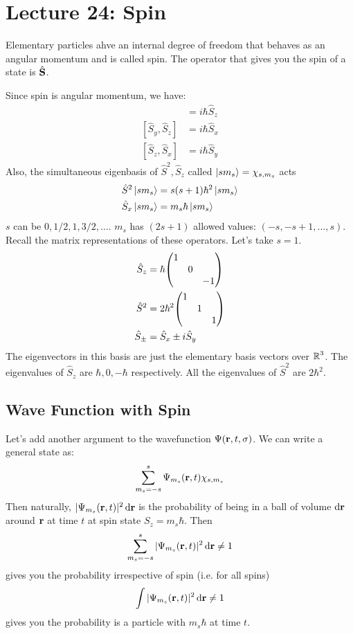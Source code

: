 \section{Lecture 24: Spin} 

\begin{definition}[Spin]
    Elementary particles ahve an internal degree of freedom that behaves as an angular momentum and is called spin.
    The operator that gives you the spin of a state is $\hat{\mathbf{S}}$.
\end{definition}

Since spin is angular momentum, we have:
\begin{align*}
    [\hat{S}_x, \hat{S}_y] &= i \hbar \hat{S}_z \\
    [\hat{S}_y, \hat{S}_z] &= i \hbar \hat{S}_x \\
    [\hat{S}_z, \hat{S}_x] &= i \hbar \hat{S}_y
\end{align*}
Also, the simultaneous eigenbasis of $\hat{S}^2, \hat{S}_z$ called $\ket{s m_s} = \chi_{s, m_{s}}$ acts
\begin{align*}
    \hat{S}^2 \ket{s m_s} &= s(s + 1)\hbar^2 \ket{s m_s} \\
    \hat{S}_x \ket{s m_s} &= m_s\hbar \ket{s m_s} \\
\end{align*}
$s$ can be $0, 1/2, 1, 3/2, \dots$. $m_s$ has $(2s + 1)$ allowed values: $(-s, -s + 1, \dots, s)$. Recall the matrix
representations of these operators. Let's take $s = 1$.
\begin{align*}
    \hat{S}_z &= \hbar \mqty(\dmat{1, 0, -1}) \\
    \hat{S}^2 &= 2 \hbar^2 \mqty(\dmat{1, 1, 1}) \\
    \hat{S}_{\pm} &= \hat{S}_x \pm i \hat{S}_y
\end{align*}
The eigenvectors in this basis are just the elementary basis vectors over $\operatorname{\mathbb{R}}^3$. The eigenvalues of $\hat{S}_z$ are $\hbar, 0, -\hbar$ respectively.
All the eigenvalues of $\hat{S}^2$ are $2\hbar^2$.

\subsection{Wave Function with Spin}
Let's add another argument to the wavefunction $\Psi(\mathbf{r}, t, \sigma)$. We can write a general state as:
\begin{align*}
    \sum_{m_s = -s}^{s} \Psi_{m_s}(\mathbf{r}, t) \chi_{s, m_{s}}
\end{align*}
Then naturally, $|\Psi_{m_s}(\mathbf{r}, t)|^2 \dd{\mathbf{r}}$ is the probability of being in a ball of volume $\dd{\mathbf{r}}$ around $\mathbf{r}$
at time $t$ at spin state $S_z = m_s \hbar$. Then
\[ \sum_{m_s = -s}^s |\Psi_{m_s}(\mathbf{r}, t)|^2 \dd{\mathbf{r}} \neq 1 \]
gives you the probability irrespective of spin (i.e. for all spins)
\[ \int |\Psi_{m_s}(\mathbf{r}, t)|^2 \dd{\mathbf{r}} \neq 1 \]
gives you the probability is a particle with $m_s \hbar$ at time $t$.

